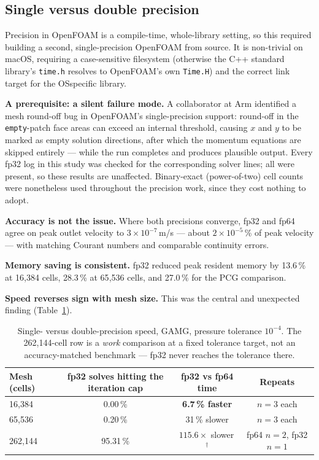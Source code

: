 \documentclass[10pt,twocolumn]{article}
\begin{document}
\subsection{Single versus double precision}

Precision in OpenFOAM is a compile-time, whole-library setting, so this required
building a second, single-precision OpenFOAM from source. It is non-trivial on
macOS, requiring a case-sensitive filesystem (otherwise the C++ standard
library's \texttt{time.h} resolves to OpenFOAM's own \texttt{Time.H}) and the
correct link target for the OSspecific library.

\textbf{A prerequisite: a silent failure mode.} A collaborator at Arm identified a
mesh round-off bug in OpenFOAM's single-precision support: round-off in the
\texttt{empty}-patch face areas can exceed an internal threshold, causing $x$ and
$y$ to be marked as empty solution directions, after which the momentum
equations are skipped entirely --- while the run completes and produces
plausible output. Every fp32 log in this study was checked for the corresponding
solver lines; all were present, so these results are unaffected. Binary-exact
(power-of-two) cell counts were nonetheless used throughout the precision work,
since they cost nothing to adopt.

\textbf{Accuracy is not the issue.} Where both precisions converge, fp32 and
fp64 agree on peak outlet velocity to $3\times10^{-7}$\,m/s --- about
$2\times10^{-5}$\,\% of peak velocity --- with matching Courant numbers and
comparable continuity errors.

\textbf{Memory saving is consistent.} fp32 reduced peak resident memory by
13.6\,\% at 16{,}384 cells, 28.3\,\% at 65{,}536 cells, and 27.0\,\% for the PCG
comparison.

\textbf{Speed reverses sign with mesh size.} This was the central and unexpected
finding (Table~\ref{tab:speed}).

\begin{table}[t]
  \centering
  \small
  \caption{Single- versus double-precision speed, GAMG, pressure tolerance
  $10^{-4}$. The 262{,}144-cell row is a \emph{work} comparison at a fixed
  tolerance target, not an accuracy-matched benchmark --- fp32 never reaches the
  tolerance there.}
  \label{tab:speed}
  \begin{tabular}{lccc}
    \toprule
    \textbf{Mesh (cells)} & \textbf{fp32 solves hitting the iteration cap} &
    \textbf{fp32 vs fp64 time} & \textbf{Repeats}\\
    \midrule
    16{,}384  & 0.00\,\%  & \textbf{6.7\,\% faster} & $n=3$ each\\
    65{,}536  & 0.20\,\%  & 31\,\% slower           & $n=3$ each\\
    262{,}144 & 95.31\,\% & $115.6\times$ slower\,$^{\dagger}$ & fp64 $n=2$, fp32 $n=1$\\
    \bottomrule
  \end{tabular}
\end{table}
\end{document}
